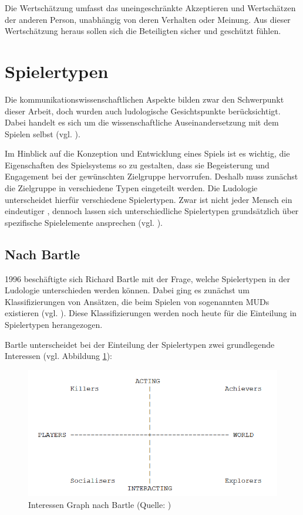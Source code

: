 Die Wertschätzung umfasst das uneingeschränkte Akzeptieren und Wertschätzen der anderen Person, unabhängig von deren Verhalten oder Meinung. Aus dieser Wertschätzung heraus sollen sich die Beteiligten sicher und geschützt fühlen.

\section{Spielertypen}
Die kommunikationswissenschaftlichen Aspekte bilden zwar den Schwerpunkt dieser Arbeit, doch wurden auch ludologische Gesichtspunkte
berücksichtigt. Dabei handelt es sich um die wissenschaftliche Auseinandersetzung mit dem Spielen selbst (vgl. \citealp{institut_fur_ludologie_spielforschung_nodate}). 

Im Hinblick auf die Konzeption und Entwicklung eines Spiels ist es wichtig, die Eigenschaften des Spielsystems so zu gestalten, dass sie Begeisterung und Engagement bei der gewünschten Zielgruppe hervorrufen. Deshalb muss zunächst die Zielgruppe in verschiedene Typen eingeteilt werden. Die Ludologie unterscheidet hierfür verschiedene Spielertypen. Zwar ist nicht jeder Mensch ein eindeutiger , dennoch lassen sich unterschiedliche Spielertypen grundsätzlich über spezifische Spielelemente ansprechen (vgl. \citealp{institut_fur_ludologie_spielertypen_nodate}).

\subsection{Nach Bartle}
1996 beschäftigte sich Richard Bartle mit der Frage, welche Spielertypen in der Ludologie unterschieden werden können. Dabei ging es zunächst um Klassifizierungen von Ansätzen, die beim Spielen von sogenannten \ac{MUD}s existieren (vgl. \cite{bartle_hearts_1996}). Diese Klassifizierungen werden noch heute für die Einteilung in Spielertypen herangezogen.

Bartle unterscheidet bei der Einteilung der Spielertypen zwei grundlegende Interessen (vgl. Abbildung \ref{fig:bartle-muds}):

\begin{figure}[ht]
\centering
\includegraphics[width=1\linewidth]{content/pictures/basic_interests.PNG}
\caption{Interessen Graph nach Bartle (Quelle: \citealp{bartle_hearts_1996})}
\label{fig:bartle-muds}
\end{figure}

